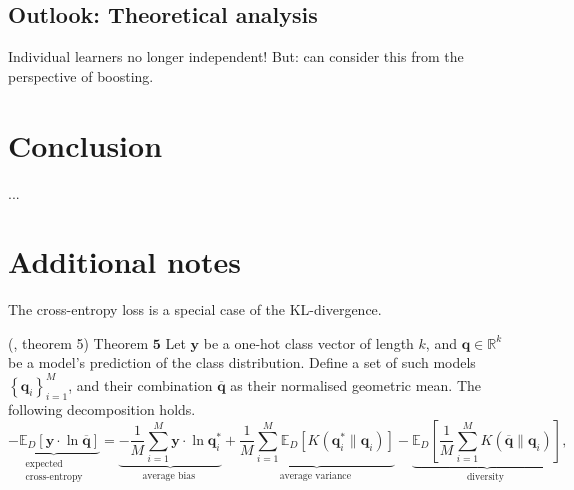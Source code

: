 \documentclass[
    a4paper, %
	fontsize=10pt, %
	twoside=false, %
]{kaobook}
\begin{document}
\begin{titlepage}
\section{Outlook: Theoretical analysis}

Individual learners no longer independent! But: can consider this from the perspective of boosting.


\chapter{Conclusion}
...




\appendix %


\chapter{Additional notes}

The cross-entropy loss is a special case of the KL-divergence.
\begin{lemma} (\cite{wood23}, theorem 5) \label{thm:cross-entropy-decomp}
    Theorem $\mathbf{5}$ Let $\mathbf{y}$ be a one-hot class vector of length $k$, and $\mathbf{q} \in \mathbb{R}^k$ be a model's prediction of the class distribution. Define a set of such models $\left\{\mathbf{q}_i\right\}_{i=1}^M$, and their combination $\overline{\mathbf{q}}$ as their normalised geometric mean. The following decomposition holds.
    $$
    \underbrace{-\mathbb{E}_D[\mathbf{y} \cdot \ln \overline{\mathbf{q}}]}_{\begin{array}{c}
    \text { expected } \\
    \text { cross-entropy }
    \end{array}}=\underbrace{-\frac{1}{M} \sum_{i=1}^M \mathbf{y} \cdot \ln \mathbf{q}_i^*}_{\text {average bias }}+\underbrace{\frac{1}{M} \sum_{i=1}^M \mathbb{E}_D\left[K\left(\mathbf{q}_i^* \| \mathbf{q}_i\right)\right]}_{\text {average variance }}-\underbrace{\mathbb{E}_D\left[\frac{1}{M} \sum_{i=1}^M K\left(\overline{\mathbf{q}} \| \mathbf{q}_i\right)\right]}_{\text {diversity }},
    $$
\end{lemma}



\end{titlepage}
\end{document}
